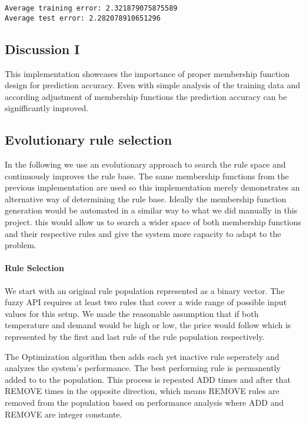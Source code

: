 \documentclass[11pt]{article}
\begin{document}
    \begin{Verbatim}[commandchars=\\\{\}]
Average training error: 2.321879075875589
Average test error: 2.282078910651296

    \end{Verbatim}

    \subsection{Discussion I}\label{discussion-i}

This implementation showcases the importance of proper membership
function design for prediction accuracy. Even with simple analysis of
the training data and according adjustment of membership functions the
prediction accuracy can be signifficantly improved.

    \subsection{Evolutionary rule
selection}\label{evolutionary-rule-selection}

In the following we use an evolutionary approach to search the rule
space and continuously improves the rule base. The same membership
functions from the previous implementation are used so this
implementation merely demonstrates an alternative way of determining the
rule base. Ideally the membership function generation would be automated
in a similar way to what we did manually in this project. this would
allow us to search a wider space of both membership functions and their
respective rules and give the system more capacity to adapt to the
problem.

\paragraph{Rule Selection}\label{rule-selection}

We start with an original rule population represented as a binary
vector. The fuzzy API requires at least two rules that cover a wide
range of possible input values for this setup. We made the reasonable
assumption that if both temperature and demand would be high or low, the
price would follow which is represented by the first and last rule of
the rule population respectively.

The Optimization algorithm then adds each yet inactive rule seperately
and analyzes the system's performance. The best performing rule is
permanently added to to the population. This process is repeated ADD
times and after that REMOVE times in the opposite direction, which means
REMOVE rules are removed from the population based on performance
analysis where ADD and REMOVE are integer constante.
\end{document}

